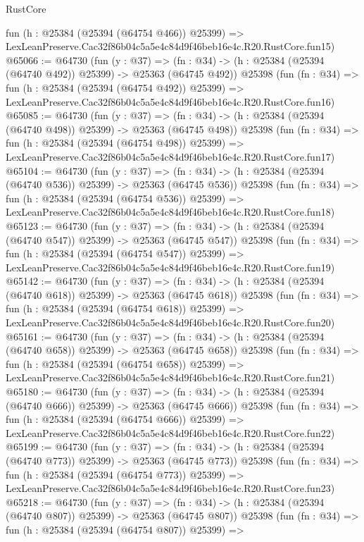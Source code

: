 \begin{lexlean}{RustCore}
\begin{coremodule}
    fun (h : @25384 (@25394 (@64754 @466)) @25399) =>
    LexLeanPreserve.Cac32f86b04c5a5e4c84d9f46beb16e4c.R20.RustCore.fun15)
@65066 := @64730
    (fun (y : @37) =>
    (fn : @34) -> (h : @25384 (@25394 (@64740 @492)) @25399) -> @25363 (@64745 @492))
    @25398
    (fun (fn : @34) =>
    fun (h : @25384 (@25394 (@64754 @492)) @25399) =>
    LexLeanPreserve.Cac32f86b04c5a5e4c84d9f46beb16e4c.R20.RustCore.fun16)
@65085 := @64730
    (fun (y : @37) =>
    (fn : @34) -> (h : @25384 (@25394 (@64740 @498)) @25399) -> @25363 (@64745 @498))
    @25398
    (fun (fn : @34) =>
    fun (h : @25384 (@25394 (@64754 @498)) @25399) =>
    LexLeanPreserve.Cac32f86b04c5a5e4c84d9f46beb16e4c.R20.RustCore.fun17)
@65104 := @64730
    (fun (y : @37) =>
    (fn : @34) -> (h : @25384 (@25394 (@64740 @536)) @25399) -> @25363 (@64745 @536))
    @25398
    (fun (fn : @34) =>
    fun (h : @25384 (@25394 (@64754 @536)) @25399) =>
    LexLeanPreserve.Cac32f86b04c5a5e4c84d9f46beb16e4c.R20.RustCore.fun18)
@65123 := @64730
    (fun (y : @37) =>
    (fn : @34) -> (h : @25384 (@25394 (@64740 @547)) @25399) -> @25363 (@64745 @547))
    @25398
    (fun (fn : @34) =>
    fun (h : @25384 (@25394 (@64754 @547)) @25399) =>
    LexLeanPreserve.Cac32f86b04c5a5e4c84d9f46beb16e4c.R20.RustCore.fun19)
@65142 := @64730
    (fun (y : @37) =>
    (fn : @34) -> (h : @25384 (@25394 (@64740 @618)) @25399) -> @25363 (@64745 @618))
    @25398
    (fun (fn : @34) =>
    fun (h : @25384 (@25394 (@64754 @618)) @25399) =>
    LexLeanPreserve.Cac32f86b04c5a5e4c84d9f46beb16e4c.R20.RustCore.fun20)
@65161 := @64730
    (fun (y : @37) =>
    (fn : @34) -> (h : @25384 (@25394 (@64740 @658)) @25399) -> @25363 (@64745 @658))
    @25398
    (fun (fn : @34) =>
    fun (h : @25384 (@25394 (@64754 @658)) @25399) =>
    LexLeanPreserve.Cac32f86b04c5a5e4c84d9f46beb16e4c.R20.RustCore.fun21)
@65180 := @64730
    (fun (y : @37) =>
    (fn : @34) -> (h : @25384 (@25394 (@64740 @666)) @25399) -> @25363 (@64745 @666))
    @25398
    (fun (fn : @34) =>
    fun (h : @25384 (@25394 (@64754 @666)) @25399) =>
    LexLeanPreserve.Cac32f86b04c5a5e4c84d9f46beb16e4c.R20.RustCore.fun22)
@65199 := @64730
    (fun (y : @37) =>
    (fn : @34) -> (h : @25384 (@25394 (@64740 @773)) @25399) -> @25363 (@64745 @773))
    @25398
    (fun (fn : @34) =>
    fun (h : @25384 (@25394 (@64754 @773)) @25399) =>
    LexLeanPreserve.Cac32f86b04c5a5e4c84d9f46beb16e4c.R20.RustCore.fun23)
@65218 := @64730
    (fun (y : @37) =>
    (fn : @34) -> (h : @25384 (@25394 (@64740 @807)) @25399) -> @25363 (@64745 @807))
    @25398
    (fun (fn : @34) =>
    fun (h : @25384 (@25394 (@64754 @807)) @25399) =>

\end{coremodule}
\end{lexlean}
